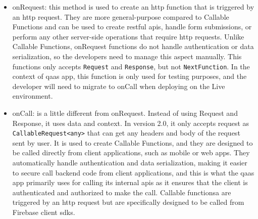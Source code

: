 \begin{multicols}{2}
      \begin{itemize}
            \item onRequest: this method is used to create an \acrshort{http} function that is triggered by an \acrshort{http}
                  request. They are more general-purpose compared to Callable Functions and can be used to create \acrshort{rest}ful
                  \acrshort{api}s, handle form submissions, or perform any other server-side operations that require \acrshort{http}
                  requests. Unlike Callable Functions, onRequest functions do not handle authentication or data serialization, so
                  the developers need to manage this aspect manually. This functions only accepts \texttt{Request} and
                  \texttt{Response}, but not \texttt{NextFunction}. In the context of \acrshort{qaas} app, this function is only used
                  for testing purposes, and the developer will need to migrate to onCall when deploying on the Live environment.
            \item onCall: is a little different from onRequest. Instead of using Request and Response, it uses data and context.
                  In version 2.0, it only accepts request as \texttt{CallableRequest<any>} that can get any headers and body
                  of the request sent by user. It is used to create Callable Functions, and they are designed to be called directly
                  from client applications, such as mobile or web apps. They automatically handle authentication and data serialization,
                  making it easier to secure call backend code from client applications, and this is what the \acrshort{qaas} app
                  primarily uses for calling its internal \acrshort{api}s as it ensures that the client is authenticated and authorized
                  to make the call. Callable functionsa are triggered by an \acrshort{http} request but are specifically designed to be
                  called from Firebase client \acrshort{sdk}s.

      \end{itemize}
\end{multicols}

